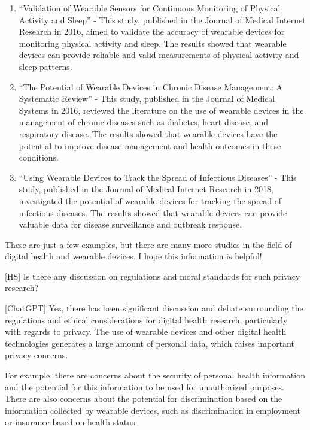 \documentclass[
]{book}
\providecommand{\tightlist}{%
  \setlength{\itemsep}{0pt}\setlength{\parskip}{0pt}}
\theoremstyle{definition}
\theoremstyle{definition}
\theoremstyle{definition}
\theoremstyle{definition}
\theoremstyle{remark}
\begin{document}
\begin{enumerate}
\def\labelenumi{\arabic{enumi}.}
\tightlist
\item
  ``Validation of Wearable Sensors for Continuous Monitoring of Physical Activity and Sleep'' - This study, published in the Journal of Medical Internet Research in 2016, aimed to validate the accuracy of wearable devices for monitoring physical activity and sleep. The results showed that wearable devices can provide reliable and valid measurements of physical activity and sleep patterns.
\item
  ``The Potential of Wearable Devices in Chronic Disease Management: A Systematic Review'' - This study, published in the Journal of Medical Systems in 2016, reviewed the literature on the use of wearable devices in the management of chronic diseases such as diabetes, heart disease, and respiratory disease. The results showed that wearable devices have the potential to improve disease management and health outcomes in these conditions.
\item
  ``Using Wearable Devices to Track the Spread of Infectious Diseases'' - This study, published in the Journal of Medical Internet Research in 2018, investigated the potential of wearable devices for tracking the spread of infectious diseases. The results showed that wearable devices can provide valuable data for disease surveillance and outbreak response.
\end{enumerate}

These are just a few examples, but there are many more studies in the field of digital health and wearable devices. I hope this information is helpful!

{[}HS{]} Is there any discussion on regulations and moral standards for such privacy research?

{[}ChatGPT{]} Yes, there has been significant discussion and debate surrounding the regulations and ethical considerations for digital health research, particularly with regards to privacy. The use of wearable devices and other digital health technologies generates a large amount of personal data, which raises important privacy concerns.

For example, there are concerns about the security of personal health information and the potential for this information to be used for unauthorized purposes. There are also concerns about the potential for discrimination based on the information collected by wearable devices, such as discrimination in employment or insurance based on health status.
\end{document}
